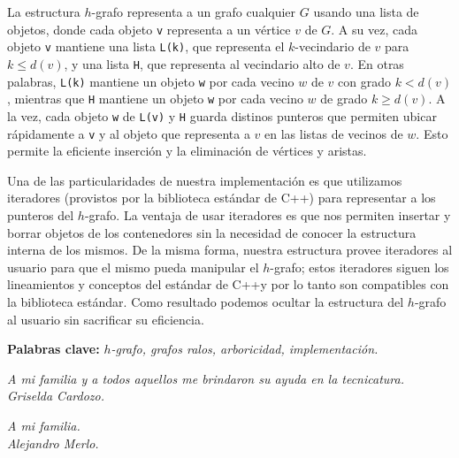 \documentclass[%
    a4paper,%
    fontsize=12pt,%
    DIV=12,
    twoside,%
    openright,%
    titlepage=true,%
    headsepline,%
    toc=bibliography,%
    parskip=half,%
    cleardoublepage=empty,%
    headings=big,%
]{scrbook}
\makeatletter
\newcommand{\Code}[2][]{\lstinline[basicstyle={\ttfamily},#1]@#2@}
\DeclareRobustCommand{\CPP}{C\nolinebreak[4]\hspace{-.05em}\raisebox{.4ex}{\relsize{-3}\textbf{++}}\xspace}
\def\CPP{C++}%
\makeatother
\begin{document}
La estructura $h$-grafo representa a un grafo cualquier $G$ usando una lista de objetos, donde cada objeto \Code{v} representa a un vértice $v$ de $G$.  A su vez, cada objeto \Code{v} mantiene una lista \Code{L(k)}, que representa el $k$-vecindario de $v$ para $k \leq d(v)$, y una lista \Code{H}, que representa al vecindario alto de $v$.  En otras palabras, \Code{L(k)} mantiene un objeto \Code{w} por cada vecino $w$ de $v$ con grado $k < d(v)$, mientras que \Code{H} mantiene un objeto \Code{w} por cada vecino $w$ de grado $k \geq d(v)$.  A la vez, cada objeto \Code{w} de \Code{L(v)} y \Code{H} guarda distinos punteros que permiten ubicar rápidamente a \Code{v} y al objeto que representa a $v$ en las listas de vecinos de $w$.  Esto permite la eficiente inserción y la eliminación de vértices y aristas.

Una de las particularidades de nuestra implementación es que utilizamos iteradores (provistos por la biblioteca estándar de \CPP) para representar a los punteros del $h$-grafo.  La ventaja de usar iteradores es que nos permiten insertar y borrar objetos de los contenedores sin la necesidad de conocer la estructura interna de los mismos.  De la misma forma, nuestra estructura provee iteradores al usuario para que el mismo pueda manipular el $h$-grafo; estos iteradores siguen los lineamientos y conceptos del estándar de \CPP y por lo tanto son compatibles con la biblioteca estándar.  Como resultado podemos ocultar la estructura del $h$-grafo al usuario sin sacrificar su eficiencia.

\noindent \textbf{Palabras clave:} \textit{$h$-grafo, grafos ralos, arboricidad, implementación.}

\newpage
\cleardoublepage




{\raggedleft\emph{A mi familia y a todos aquellos me brindaron su ayuda en la tecnicatura.\\ Griselda Cardozo.}\par
            \emph{A mi familia.\\ Alejandro Merlo.}\par}

\cleardoublepage
\end{document}
